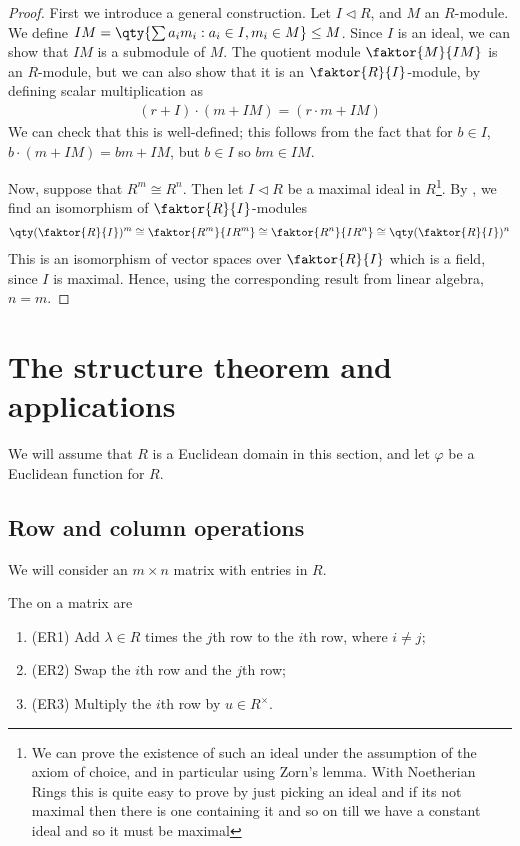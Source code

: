 \begin{proof}
	First we introduce a general construction.
	Let $I \triangleleft R$, and $M$ an $R$-module.
	We define $IM = \qty{\sum a_i m_i : a_i \in I, m_i \in M} \leq M$.
	Since $I$ is an ideal, we can show that $IM$ is a submodule of $M$.
	The quotient module $\faktor{M}{IM}$ is an $R$-module, but we can also show that it is an $\faktor{R}{I}$-module, by defining scalar multiplication as
	\begin{align*}
		(r+I) \cdot (m+IM) = (r \cdot m + IM)
	\end{align*}
	We can check that this is well-defined; this follows from the fact that for $b \in I$, $b \cdot (m + IM) = bm + IM$, but $b \in I$ so $bm \in IM$.

	Now, suppose that $R^m \cong R^n$.
	Then let $I \triangleleft R$ be a maximal ideal in $R$\footnote{We can prove the existence of such an ideal under the assumption of the axiom of choice, and in particular using Zorn's lemma. With Noetherian Rings this is quite easy to prove by just picking an ideal and if its not maximal then there is one containing it and so on till we have a constant ideal and so it must be maximal}.
	By , we find an isomorphism of $\faktor{R}{I}$-modules
	\begin{align*}
		\qty(\faktor{R}{I})^m \cong \faktor{R^m}{IR^m} \cong \faktor{R^n}{IR^n} \cong \qty(\faktor{R}{I})^n
	\end{align*}
	This is an isomorphism of vector spaces over $\faktor{R}{I}$ which is a field, since $I$ is maximal.
	Hence, using the corresponding result from linear algebra, $n = m$.
\end{proof}

\section{The structure theorem and applications}
We will assume that $R$ is a Euclidean domain in this section, and let $\varphi$ be a Euclidean function for $R$.
\subsection{Row and column operations}

We will consider an $m \times n$ matrix with entries in $R$.

\begin{definition}
	The  on a matrix are
	\begin{enumerate}
		\item (ER1) Add $\lambda \in R$ times the $j$th row to the $i$th row, where $i \neq j$;
		\item (ER2) Swap the $i$th row and the $j$th row;
		\item (ER3) Multiply the $i$th row by $u \in R^\times$.
	\end{enumerate}
\end{definition}

